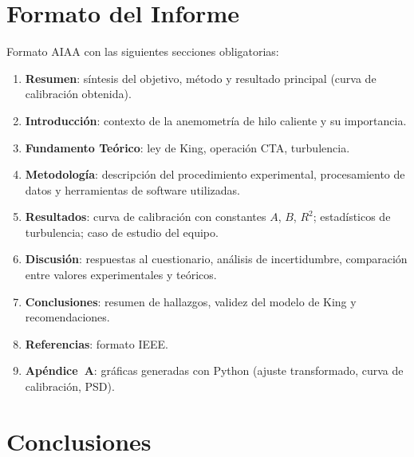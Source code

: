 \documentclass[12pt,a4paper]{article}
\begin{document}
\section{Formato del Informe}
\label{sec:informe}

Formato AIAA con las siguientes secciones obligatorias:

\begin{enumerate}
	\item \textbf{Resumen}: síntesis del objetivo, método y resultado
	      principal (curva de calibración obtenida).
	\item \textbf{Introducción}: contexto de la anemometría de hilo caliente
	      y su importancia.
	\item \textbf{Fundamento Teórico}: ley de King, operación CTA,
	      turbulencia.
	\item \textbf{Metodología}: descripción del procedimiento experimental,
	      procesamiento de datos y herramientas de software utilizadas.
	\item \textbf{Resultados}: curva de calibración con constantes $A$, $B$,
	      $R^2$; estadísticos de turbulencia; caso de estudio del equipo.
	\item \textbf{Discusión}: respuestas al cuestionario, análisis de
	      incertidumbre, comparación entre valores experimentales y teóricos.
	\item \textbf{Conclusiones}: resumen de hallazgos, validez del modelo de
	      King y recomendaciones.
	\item \textbf{Referencias}: formato IEEE.
	\item \textbf{Apéndice~A}: gráficas generadas con Python (ajuste
	      transformado, curva de calibración, PSD).
\end{enumerate}

\section{Conclusiones}
\label{sec:conclusiones}
\end{document}

